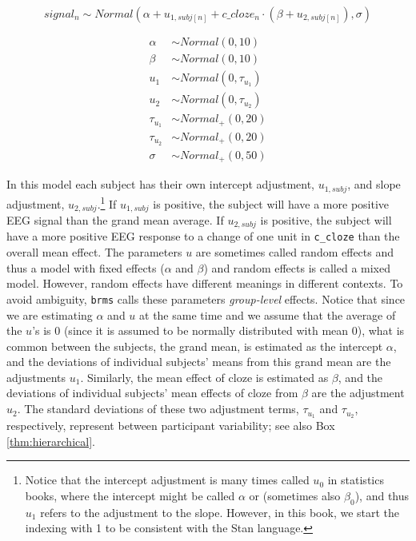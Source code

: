 \documentclass[12pt,]{krantz}
\theoremstyle{definition}
\theoremstyle{definition}
\theoremstyle{definition}
\theoremstyle{remark}
\begin{document}
\begin{equation}
  signal_n \sim Normal(\alpha + u_{1,subj[n]} + c\_cloze_n \cdot (\beta+ u_{2,subj[n]}),\sigma)
 \end{equation}

\begin{equation}
 \begin{aligned}
 \alpha &\sim Normal(0,10)\\
 \beta  &\sim Normal(0,10)\\
 u_1 &\sim Normal(0,\tau_{u_1})\\
 u_2 &\sim Normal(0,\tau_{u_2})\\
 \tau_{u_1} &\sim Normal_+(0,20) \\
 \tau_{u_2} &\sim Normal_+(0,20) \\
 \sigma  &\sim Normal_+(0,50)
 \end{aligned}
 \end{equation}

In this model each subject has their own intercept adjustment, \(u_{1,subj}\), and slope adjustment, \(u_{2,subj}\).\footnote{Notice that the intercept adjustment is many times called \(u_0\) in statistics books, where the intercept might be called \(\alpha\) or (sometimes also \(\beta_0\)), and thus \(u_1\) refers to the adjustment to the slope. However, in this book, we start the indexing with 1 to be consistent with the Stan language.} If \(u_{1,subj}\) is positive, the subject will have a more positive EEG signal than the grand mean average. If \(u_{2,subj}\) is positive, the subject will have a more positive EEG response to a change of one unit in \texttt{c\_cloze} than the overall mean effect. The parameters \(u\) are sometimes called random effects and thus a model with fixed effects (\(\alpha\) and \(\beta\)) and random effects is called a mixed model. However, random effects have different meanings in different contexts. To avoid ambiguity, \texttt{brms} calls these parameters \emph{group-level} effects. Notice that since we are estimating \(\alpha\) and \(u\) at the same time and we assume that the average of the \(u\)'s is 0 (since it is assumed to be normally distributed with mean 0), what is common between the subjects, the grand mean, is estimated as the intercept \(\alpha\), and the deviations of individual subjects' means from this grand mean are the adjustments \(u_1\). Similarly, the mean effect of cloze is estimated as \(\beta\), and the deviations of individual subjects' mean effects of cloze from \(\beta\) are the adjustment \(u_2\). The standard deviations of these two adjustment terms, \(\tau_{u_1}\) and \(\tau_{u_2}\), respectively, represent between participant variability; see also Box \ref{thm:hierarchical}.
\end{document}
